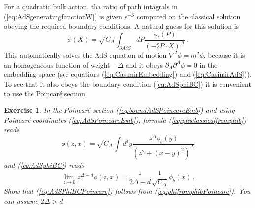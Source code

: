 \documentclass{ws-rv9x6}
\newtheorem{exercise}{Exercise}[section]
\begin{document}
For a quadratic bulk action, tha ratio of path intagrals in (\ref{eq:AdSgeneratingfunctionW})
is given $e^{-S}$ computed on the classical solution obeying the
required boundary conditions. A natural guess for this solution is 
\begin{equation}
\phi(X)=\sqrt{C_{\Delta}}\int_{\partial AdS}dP\frac{\phi_{b}(P)}{(-2P\cdot X)^{\Delta}}\ .\label{eq:phiclassicalfromphib}
\end{equation}
This automatically solves the AdS equation of motion $\nabla^{2}\phi=m^{2}\phi$,
because it is an homogeneous function of weight $-\Delta$ and it
obeys $\partial_{A}\partial^{A}\phi=0$ in the embedding space (see
equations (\ref{eq:CasimirEmbedding}) and (\ref{eq:CasimirAdS})).
To see that it also obeys the boundary condition (\ref{eq:AdSphiBC})
it is convenient to use the Poincaré section.
\begin{exercise} 
In the Poincaré section (\ref{eq:boundAdSPoincareEmb})
and using Poincaré coordinates (\ref{eq:AdSPoincareEmb}), formula
(\ref{eq:phiclassicalfromphib}) reads
\begin{equation}
\phi\left(z,x\right)=\sqrt{C_{\Delta}}\int d^{d}y\frac{z^{\Delta}\phi_{b}(y)}{\left(z^{2}+(x-y)^{2}\right)^{\Delta}}\label{eq:phifromphibPoincare}
\end{equation}
and (\ref{eq:AdSphiBC}) reads 
\begin{equation}
\lim_{z\to0}z^{\Delta-d}\phi(z,x)=\frac{1}{2\Delta-d}\frac{1}{\sqrt{C_{\Delta}}}\phi_{b}(x)\ .\label{eq:AdSPhiBCPoincare}
\end{equation}
Show that (\ref{eq:AdSPhiBCPoincare}) follows from (\ref{eq:phifromphibPoincare}).
You can assume $2\Delta>d$.
\end{exercise}
\end{document}
